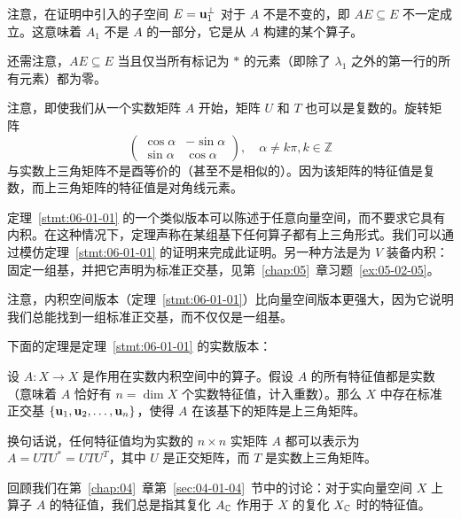 \begin{remark*}
注意，在证明中引入的子空间 $E = \mathbf{u}_1^\perp$ 对于 $A$ 不是不变的，即 $AE \subseteq E$ 不一定成立。这意味着 $A_1$ 不是 $A$ 的一部分，它是从 $A$ 构建的某个算子。
\end{remark*}

还需注意，$AE \subseteq E$ 当且仅当所有标记为 $*$ 的元素（即除了 $\lambda_1$ 之外的第一行的所有元素）都为零。

\begin{remark*}
注意，即使我们从一个实数矩阵 $A$ 开始，矩阵 $U$ 和 $T$ 也可以是复数的。旋转矩阵 $$\begin{pmatrix} \cos \alpha & -\sin \alpha \\ \sin \alpha & \cos \alpha \end{pmatrix}, \quad \alpha \neq k\pi, k \in \mathbb{Z}$$
与实数上三角矩阵不是酉等价的（甚至不是相似的）。因为该矩阵的特征值是复数，而上三角矩阵的特征值是对角线元素。
\end{remark*}

\begin{remark*}
定理~\ref{stmt:06-01-01} 的一个类似版本可以陈述于任意向量空间，而不要求它具有内积。在这种情况下，定理声称在某组基下任何算子都有上三角形式。我们可以通过模仿定理~\ref{stmt:06-01-01} 的证明来完成此证明。另一种方法是为 $V$ 装备内积：固定一组基，并把它声明为标准正交基，见第~\ref{chap:05}~章习题~\ref{ex:05-02-05}。
\end{remark*}

注意，内积空间版本（定理~\ref{stmt:06-01-01}）比向量空间版本更强大，因为它说明我们总能找到一组标准正交基，而不仅仅是一组基。

下面的定理是定理~\ref{stmt:06-01-01} 的实数版本：

\begin{theorem}\label{stmt:06-01-02} 设 $A: X \to X$ 是作用在实数内积空间中的算子。假设 $A$ 的所有特征值都是实数（意味着 $A$ 恰好有 $n = \dim X$ 个实数特征值，计入重数）。那么 $X$ 中存在标准正交基 $\{\mathbf{u}_1, \mathbf{u}_2, \dots, \mathbf{u}_n\}$，使得 $A$ 在该基下的矩阵是上三角矩阵。

换句话说，任何特征值均为实数的 $n \times n$ 实矩阵 $A$ 都可以表示为 $A = UTU^* = U T U^T$，其中 $U$ 是正交矩阵，而 $T$ 是实数上三角矩阵。\end{theorem}

\begin{remark}\label{stmt:06-01-03}
回顾我们在第~\ref{chap:04}~章第~\ref{sec:04-01-04}~节中的讨论：对于实向量空间 $X$ 上算子 $A$ 的特征值，我们总是指其复化 $A_{\mathbb{C}}$ 作用于 $X$ 的复化 $X_{\mathbb{C}}$ 时的特征值。
\end{remark}

